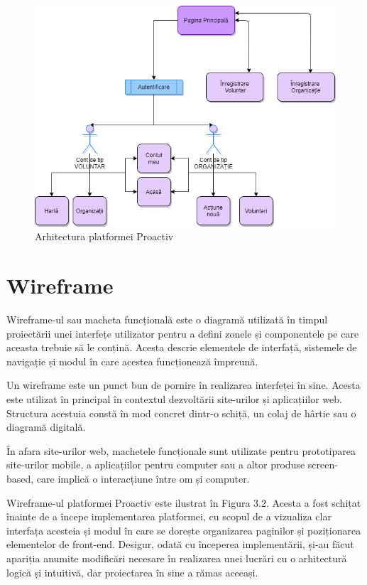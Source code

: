 \documentclass[12pt,a4paper]{report}
\begin{document}
\begin{figure}[H]
\centering
  \includegraphics[width=1\linewidth]{./imagini/arhitectura.png}
  \caption{Arhitectura platformei Proactiv}
\end{figure}

\section{Wireframe}
\par
Wireframe-ul sau macheta funcțională este o diagramă utilizată în timpul proiectării unei interfețe utilizator pentru a defini zonele și componentele pe care aceasta trebuie să le conțină. Acesta descrie elementele de interfață, sistemele de navigație și modul în care acestea funcționează împreună.
\\\par
Un wireframe este un punct bun de pornire în realizarea interfeței în sine. Acesta este utilizat în principal în contextul dezvoltării site-urilor și aplicațiilor web. Structura acestuia constă în mod concret dintr-o schiță, un colaj de hârtie sau o diagramă digitală.
\\\par
În afara site-urilor web, machetele funcționale sunt utilizate pentru prototiparea site-urilor mobile, a aplicațiilor pentru computer sau a altor produse screen-based, care implică o interacțiune între om și computer.
\\\par
Wireframe-ul platformei Proactiv este ilustrat în Figura 3.2. Acesta a fost schițat înainte de a începe implementarea platformei, cu scopul de a vizualiza clar interfața acesteia și modul în care se dorește organizarea paginilor și poziționarea elementelor de front-end. 
Desigur, odată cu începerea implementării, și-au făcut apariția anumite modificări necesare în realizarea unei lucrări cu o arhitectură logică și intuitivă, dar proiectarea în sine a rămas aceeași.
\end{document}
